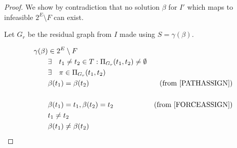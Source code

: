 \documentclass{article}
\begin{document}
\begin{proof}
We show by contradiction that no solution $\beta$ for $I'$ which maps to infeasible $2^E \setminus F$ can exist.

Let $G_r$ be the residual graph from $I$ made using $S = \gamma(\beta)$.

\begin{align}
	\nonumber \gamma(\beta) & \in 2^E \setminus F \\
	\nonumber & \exists \quad t_1\neq t_2 \in T : \Pi_{G_r}(t_1, t_2) \neq \emptyset \\
	\nonumber & \exists \quad \pi \in \Pi_{G_r}(t_1, t_2) \\
	\nonumber & \beta(t_1) = \beta(t_2) & \mbox{(from \ref{PATHASSIGN})}\\
	\nonumber \\
	\nonumber & \beta(t_1) = t_1, \beta(t_2) = t_2 & \mbox{(from \ref{FORCEASSIGN})} \\
	\nonumber & t_1 \neq t_2 \\
	\nonumber & \beta(t_1) \neq \beta(t_2)
\end{align}

\end{proof}



\end{document}
